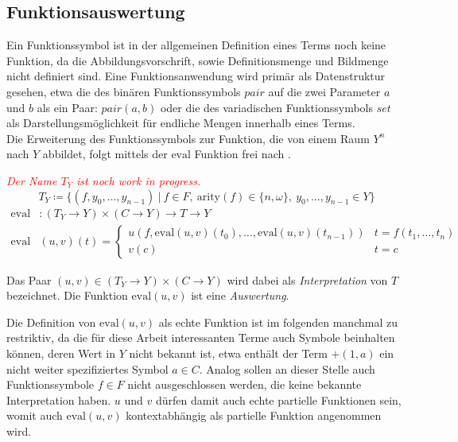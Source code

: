 \documentclass{article}
\begin{document}
\subsection{Funktionsauswertung}
Ein Funktionssymbol ist in der allgemeinen Definition eines Terms noch keine Funktion, da die Abbildungsvorschrift, sowie Definitionsmenge und Bildmenge nicht definiert sind. Eine Funktionsanwendung wird primär als Datenstruktur gesehen, etwa die des binären Funktionssymbols $pair$ auf die zwei Parameter $a$ und $b$ als ein Paar: $pair(a, b)$ oder die des variadischen Funktionssymbols $set$ als Darstellungsmöglichkeit für endliche Mengen innerhalb eines Terms.\\
Die Erweiterung des Funktionssymbols zur Funktion, die von einem Raum $Y^n$ nach $Y$ abbildet, folgt mittels der $\mathrm{eval}$ Funktion frei nach \cite{buch1977}.

\textcolor{red}{\textit{Der Name $T_Y$ ist noch work in progress.}}
$$T_Y \coloneqq \{(f, y_0, \dots, y_{n-1})~|~f \in F,~\mathrm{arity}(f) \in \{n, \omega\},
~ y_0, \dots,y_{n-1} \in Y\}$$
\begin{equation*}
    \begin{split}
	\mathrm{eval} &\colon (T_Y \rightarrow Y) \times (C \rightarrow Y) \rightarrow T \rightarrow Y\\
	\mathrm{eval} &(u, v)(t) = \begin{cases}
		u(f, \mathrm{eval}(u, v)(t_0), \dots, \mathrm{eval}(u, v)(t_{n-1})) & t = f(t_1, \dots, t_n)\\
		v(c)                                                                                            & t = c
		\end{cases}
    \end{split}
\end{equation*}

Das Paar $(u, v) \in (T_Y \rightarrow Y) \times (C \rightarrow Y)$ wird dabei als \emph{Interpretation} von $T$ bezeichnet. Die Funktion $\mathrm{eval}(u, v)$ ist eine \emph{Auswertung}. 

Die Definition von $\mathrm{eval}(u, v)$ als echte Funktion ist im folgenden manchmal zu restriktiv, da die für diese Arbeit interessanten Terme auch Symbole beinhalten können, deren Wert in $Y$ nicht bekannt ist, etwa enthält der Term $+(1, a)$ ein nicht weiter spezifiziertes Symbol $a \in C$. Analog sollen an dieser Stelle auch Funktionssymbole $f \in F$ nicht ausgeschlossen werden, die keine bekannte Interpretation haben. $u$ und $v$ dürfen damit auch echte partielle Funktionen sein, womit auch $\mathrm{eval}(u, v)$ kontextabhängig als partielle Funktion angenommen wird.
\\~\\
\end{document}
